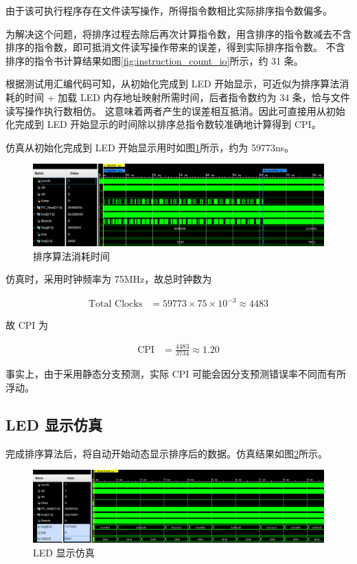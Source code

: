 \documentclass[a4paper]{article}  %
\begin{document}
由于该可执行程序存在文件读写操作，所得指令数相比实际排序指令数偏多。

为解决这个问题，将排序过程去除后再次计算指令数，用含排序的指令数减去不含排序的指令数，即可抵消文件读写操作带来的误差，得到实际排序指令数。
不含排序的指令书计算结果如图\ref{fig:instruction_count_io}所示，约 31 条。

根据测试用汇编代码可知，从初始化完成到 LED 开始显示，可近似为排序算法消耗的时间 + 加载 LED 内存地址映射所需时间，后者指令数约为 34 条，恰与文件读写操作执行数相仿。
这意味着两者产生的误差相互抵消。因此可直接用从初始化完成到 LED 开始显示的时间除以排序总指令数较准确地计算得到 CPI。

仿真从初始化完成到 LED 开始显示用时如图\ref{fig:time_consumption}所示，约为 59773ns。

\begin{figure}[ht]
    \centering
    \includegraphics[width=.95\textwidth]{asserts/time_consumption.png}
    \caption{
        排序算法消耗时间
    }\label{fig:time_consumption}
\end{figure}

仿真时，采用时钟频率为 75MHz，故总时钟数为

\begin{align}
    \text{Total Clocks} &= 59773 \times 75 \times 10^{-3} \approx 4483
\end{align}

故 CPI 为

\begin{align}
    \text{CPI} &= \frac{4483}{3734} \approx 1.20
\end{align}

事实上，由于采用静态分支预测，实际 CPI 可能会因分支预测错误率不同而有所浮动。

\subsection{LED 显示仿真}

完成排序算法后，将自动开始动态显示排序后的数据。仿真结果如图\ref{fig:simulation_led}所示。

\begin{figure}[ht]
    \centering
    \includegraphics[width=.95\textwidth]{asserts/led.png}
    \caption{
        LED 显示仿真
    }\label{fig:simulation_led}
\end{figure}
\end{document}

